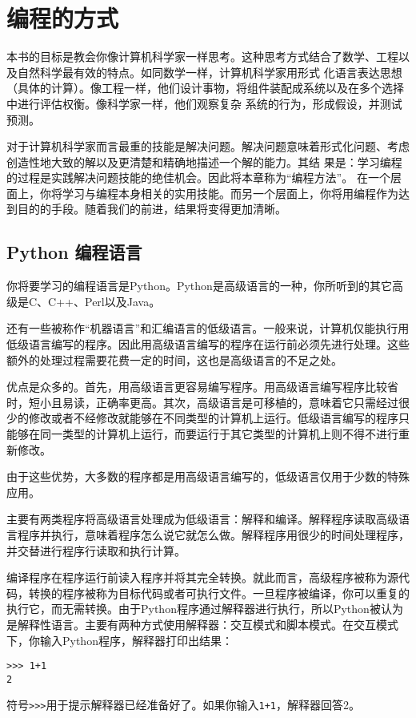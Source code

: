 \chapter{编程的方式}
本书的目标是教会你像计算机科学家一样思考。这种思考方式结合了数学、工程以及自然科学最有效的特点。如同数学一样，计算机科学家用形式
化语言表达思想（具体的计算）。像工程一样，他们设计事物，将组件装配成系统以及在多个选择中进行评估权衡。像科学家一样，他们观察复杂
系统的行为，形成假设，并测试预测。

对于计算机科学家而言最重的技能是解决问题。解决问题意味着形式化问题、考虑创造性地大致的解以及更清楚和精确地描述一个解的能力。其结
果是：学习编程的过程是实践解决问题技能的绝佳机会。因此将本章称为“编程方法”。
在一个层面上，你将学习与编程本身相关的实用技能。而另一个层面上，你将用编程作为达到目的的手段。随着我们的前进，结果将变得更加清晰。
\section{Python 编程语言}
你将要学习的编程语言是Python。Python是高级语言的一种，你所听到的其它高级是C、C++、Perl以及Java。

还有一些被称作“机器语言”和汇编语言的低级语言。一般来说，计算机仅能执行用低级语言编写的程序。因此用高级语言编写的程序在运行前必须先进行处理。这些额外的处理过程需要花费一定的时间，这也是高级语言的不足之处。

优点是众多的。首先，用高级语言更容易编写程序。用高级语言编写程序比较省时，短小且易读，正确率更高。其次，高级语言是可移植的，意味着它只需经过很少的修改或者不经修改就能够在不同类型的计算机上运行。低级语言编写的程序只能够在同一类型的计算机上运行，而要运行于其它类型的计算机上则不得不进行重新修改。

由于这些优势，大多数的程序都是用高级语言编写的，低级语言仅用于少数的特殊应用。

主要有两类程序将高级语言处理成为低级语言：解释和编译。解释程序读取高级语言程序并执行，意味着程序怎么说它就怎么做。解释程序用很少的时间处理程序，并交替进行程序行读取和执行计算。

编译程序在程序运行前读入程序并将其完全转换。就此而言，高级程序被称为源代码，转换的程序被称为目标代码或者可执行文件。一旦程序被编译，你可以重复的执行它，而无需转换。由于Python程序通过解释器进行执行，所以Python被认为是解释性语言。主要有两种方式使用解释器：交互模式和脚本模式。在交互模式下，你输入Python程序，解释器打印出结果：
\begin{lstlisting}
>>> 1+1
2
\end{lstlisting}
符号\lstinline$>>>$用于提示解释器已经准备好了。如果你输入\lstinline$1+1$，解释器回答2。

